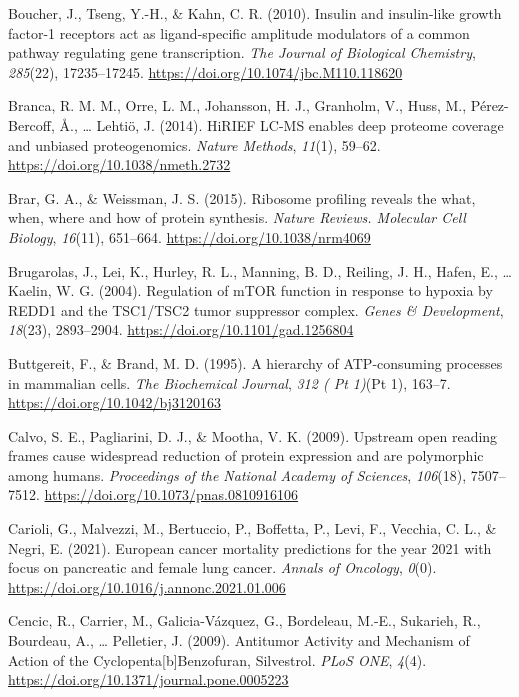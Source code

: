 \documentclass[12pt,openany]{book}
\begin{document}
\hypertarget{ref-Boucher2010}{}
Boucher, J., Tseng, Y.-H., \& Kahn, C. R. (2010). Insulin and
insulin-like growth factor-1 receptors act as ligand-specific amplitude
modulators of a common pathway regulating gene transcription. \emph{The
Journal of Biological Chemistry}, \emph{285}(22), 17235--17245.
\url{https://doi.org/10.1074/jbc.M110.118620}

\hypertarget{ref-Branca2014}{}
Branca, R. M. M., Orre, L. M., Johansson, H. J., Granholm, V., Huss, M.,
Pérez-Bercoff, Å., \ldots{} Lehtiö, J. (2014). HiRIEF LC-MS enables deep
proteome coverage and unbiased proteogenomics. \emph{Nature Methods},
\emph{11}(1), 59--62. \url{https://doi.org/10.1038/nmeth.2732}

\hypertarget{ref-Brar2015}{}
Brar, G. A., \& Weissman, J. S. (2015). Ribosome profiling reveals the
what, when, where and how of protein synthesis. \emph{Nature Reviews.
Molecular Cell Biology}, \emph{16}(11), 651--664.
\url{https://doi.org/10.1038/nrm4069}

\hypertarget{ref-Brugarolas2004}{}
Brugarolas, J., Lei, K., Hurley, R. L., Manning, B. D., Reiling, J. H.,
Hafen, E., \ldots{} Kaelin, W. G. (2004). Regulation of mTOR function in
response to hypoxia by REDD1 and the TSC1/TSC2 tumor suppressor complex.
\emph{Genes \& Development}, \emph{18}(23), 2893--2904.
\url{https://doi.org/10.1101/gad.1256804}

\hypertarget{ref-Buttgereit1995}{}
Buttgereit, F., \& Brand, M. D. (1995). A hierarchy of ATP-consuming
processes in mammalian cells. \emph{The Biochemical Journal}, \emph{312
( Pt 1)}(Pt 1), 163--7. \url{https://doi.org/10.1042/bj3120163}

\hypertarget{ref-Calvo2009}{}
Calvo, S. E., Pagliarini, D. J., \& Mootha, V. K. (2009). Upstream open
reading frames cause widespread reduction of protein expression and are
polymorphic among humans. \emph{Proceedings of the National Academy of
Sciences}, \emph{106}(18), 7507--7512.
\url{https://doi.org/10.1073/pnas.0810916106}

\hypertarget{ref-Carioli2021}{}
Carioli, G., Malvezzi, M., Bertuccio, P., Boffetta, P., Levi, F.,
Vecchia, C. L., \& Negri, E. (2021). European cancer mortality
predictions for the year 2021 with focus on pancreatic and female lung
cancer. \emph{Annals of Oncology}, \emph{0}(0).
\url{https://doi.org/10.1016/j.annonc.2021.01.006}

\hypertarget{ref-Cencic2009}{}
Cencic, R., Carrier, M., Galicia-Vázquez, G., Bordeleau, M.-E.,
Sukarieh, R., Bourdeau, A., \ldots{} Pelletier, J. (2009). Antitumor
Activity and Mechanism of Action of the Cyclopenta{[}b{]}Benzofuran,
Silvestrol. \emph{PLoS ONE}, \emph{4}(4).
\url{https://doi.org/10.1371/journal.pone.0005223}
\end{document}
